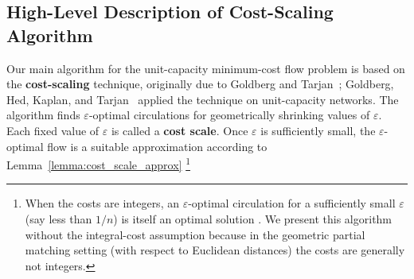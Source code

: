 \documentclass[11pt]{article}
\def\eps{\varepsilon}
\theoremstyle{plain}
\numberwithin{figure}{section}
\def\EMPH#1{\textbf{\boldmath #1}}
\begin{document}
\subsection{High-Level Description of Cost-Scaling Algorithm}

Our main algorithm for the unit-capacity minimum-cost flow problem is based on the \EMPH{cost-scaling} technique,
originally due to Goldberg and
Tarjan~\cite{GT90}; Goldberg, Hed, Kaplan, and Tarjan~\cite{GHKT17} applied the technique on unit-capacity networks.
%
The algorithm finds $\eps$-optimal circulations for geometrically shrinking
values of $\eps$.
Each fixed value of $\eps$ is called a
\EMPH{cost scale}.
Once $\eps$ is sufficiently small, the $\eps$-optimal flow is a suitable
approximation according to Lemma~\ref{lemma:cost_scale_approx}%
\footnote{When the costs are integers, an $\eps$-optimal circulation for a sufficiently small $\eps$ (say less than $1/n$) is itself an optimal solution \cite{GT90,GHKT17}.
We present this algorithm without the integral-cost assumption because in the geometric
partial matching setting (with respect to Euclidean distances) the costs are generally not integers.}

%
\end{document}
